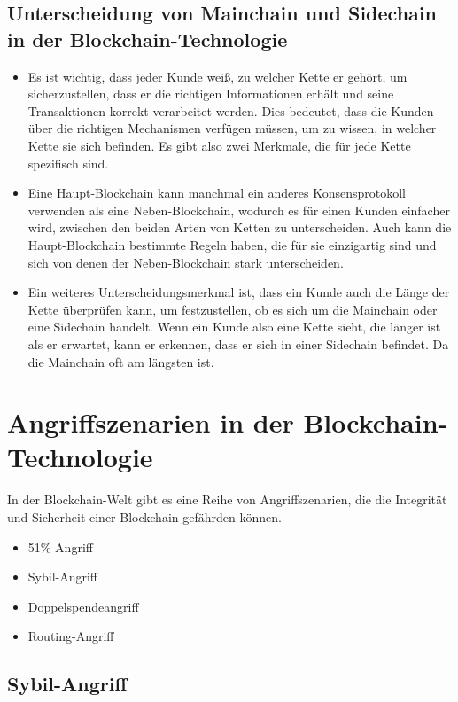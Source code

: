 \section{Unterscheidung von Mainchain und Sidechain in der Blockchain-Technologie}
\begin{itemize}
	\item Es ist wichtig, dass jeder Kunde weiß, zu welcher Kette er gehört, um sicherzustellen, dass er die richtigen Informationen erhält und seine Transaktionen korrekt verarbeitet werden. Dies bedeutet, dass die Kunden über die richtigen Mechanismen verfügen müssen, um zu wissen, in welcher Kette sie sich befinden. Es gibt also zwei Merkmale, die für jede Kette spezifisch sind.
	
	\item Eine Haupt-Blockchain kann manchmal ein anderes Konsensprotokoll verwenden als eine Neben-Blockchain, wodurch es für einen Kunden einfacher wird, zwischen den beiden Arten von Ketten zu unterscheiden. Auch kann die Haupt-Blockchain bestimmte Regeln haben, die für sie einzigartig sind und sich von denen der Neben-Blockchain stark unterscheiden.
	
	\item Ein weiteres Unterscheidungsmerkmal ist, dass ein Kunde auch die Länge der Kette überprüfen kann, um festzustellen, ob es sich um die Mainchain oder eine Sidechain handelt. Wenn ein Kunde also eine Kette sieht, die länger ist als er erwartet, kann er erkennen, dass er sich in einer Sidechain befindet. Da die Mainchain oft am längsten ist.
\end{itemize}


\chapter{Angriffszenarien in der Blockchain-Technologie}
In der Blockchain-Welt gibt es eine Reihe von Angriffszenarien, die die Integrität und Sicherheit einer Blockchain gefährden können. 
\begin{itemize}
	\item 51\% Angriff
	\item Sybil-Angriff
	\item Doppelspendeangriff
	\item Routing-Angriff
\end{itemize}


\section{Sybil-Angriff}

